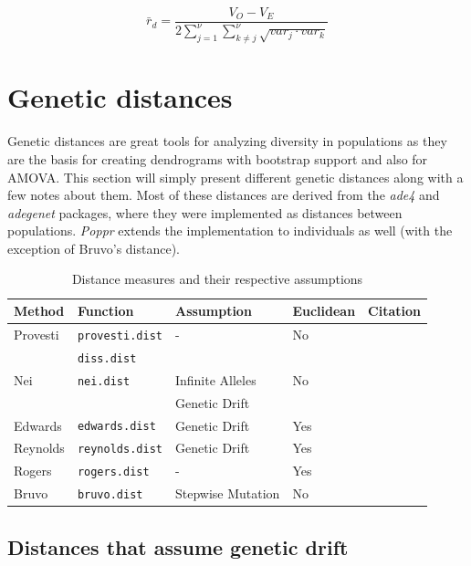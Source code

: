 \documentclass[letterpaper]{article}\usepackage[]{graphicx}\usepackage[]{color}
\newcommand{\Poppr}{\textit{Poppr}}
\newcommand{\adegenet}{\textit{adegenet}}
\begin{document}
\begin{equation}
\label{eq:r_d}
\bar{r}_d = \frac{V_O - V_E}
{2\displaystyle \sum_{j=1}^{\nu}\displaystyle \sum_{k \neq j}^{\nu}\sqrt{var_j\cdot{}var_k}}
\end{equation}

\section{Genetic distances}

Genetic distances are great tools for analyzing diversity in
populations as they are the basis for creating dendrograms with bootstrap
support and also for AMOVA. This section will simply present different genetic
distances along with a few notes about them. Most of these distances are derived
from the \textit{ade4} and \adegenet{} packages, where they were implemented as
distances between populations. \Poppr{} extends the implementation to individuals
as well (with the exception of Bruvo's distance).

\begin{table}[ht]
\centering
\caption{Distance measures and their respective assumptions}
\begin{tabular}{lllll}
  \hline
 Method & Function & Assumption & Euclidean & Citation\\ 
  \hline
Provesti & \texttt{provesti.dist} & - & No & \cite{prevosti1975distances}\\
 & \texttt{diss.dist} & & & \\
Nei & \texttt{nei.dist} & Infinite Alleles & No & \cite{nei1972genetic, nei1978estimation}\\
 & & Genetic Drift & & \\
Edwards & \texttt{edwards.dist} & Genetic Drift & Yes & \cite{edwards1971distances}\\
Reynolds & \texttt{reynolds.dist} & Genetic Drift & Yes & \cite{reynolds1983estimation}\\
Rogers & \texttt{rogers.dist} & - & Yes & \cite{rogers1972measures}\\
Bruvo & \texttt{bruvo.dist} & Stepwise Mutation & No & \cite{Bruvo:2004}\\
   \hline
\end{tabular}
\end{table}

\subsection{Distances that assume genetic drift}
\end{document}
